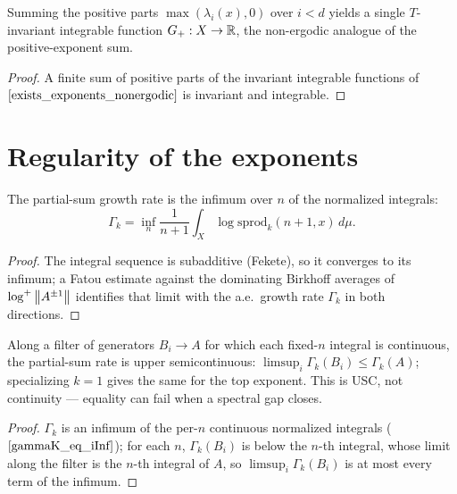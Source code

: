 \begin{corollary}\label{exists_sumPosExp_nonergodic}
  \leanok
  Summing the positive parts $\max(\lambda_i(x),0)$ over $i < d$ yields a single $T$-invariant integrable function $G_+ : X \to \mathbb{R}$, the non-ergodic analogue of the positive-exponent sum.
\end{corollary}
\begin{proof}\leanok
  A finite sum of positive parts of the invariant integrable functions of $\ref{exists_exponents_nonergodic}$ is invariant and integrable.
\end{proof}

\section{Regularity of the exponents}

\begin{theorem}\label{gammaK_eq_iInf}
  \leanok
  The partial-sum growth rate is the infimum over $n$ of the normalized integrals:
  \[ \Gamma_k = \inf_n \frac{1}{n+1}\int_X \log\mathrm{sprod}_k(n+1,x)\,d\mu. \]
\end{theorem}
\begin{proof}\leanok
  The integral sequence is subadditive (Fekete), so it converges to its infimum; a Fatou estimate against the dominating Birkhoff averages of $\log^+\left\lVert A^{\pm1} \right\rVert$ identifies that limit with the a.e.\ growth rate $\Gamma_k$ in both directions.
\end{proof}

\begin{theorem}\label{gammaK_upperSemicontinuous}
  \leanok
  Along a filter of generators $B_i \to A$ for which each fixed-$n$ integral is continuous, the partial-sum rate is upper semicontinuous: $\limsup_i \Gamma_k(B_i) \le \Gamma_k(A)$; specializing $k=1$ gives the same for the top exponent. This is USC, not continuity --- equality can fail when a spectral gap closes.
\end{theorem}
\begin{proof}\leanok
  $\Gamma_k$ is an infimum of the per-$n$ continuous normalized integrals ($\ref{gammaK_eq_iInf}$); for each $n$, $\Gamma_k(B_i)$ is below the $n$-th integral, whose limit along the filter is the $n$-th integral of $A$, so $\limsup_i \Gamma_k(B_i)$ is at most every term of the infimum.
\end{proof}

